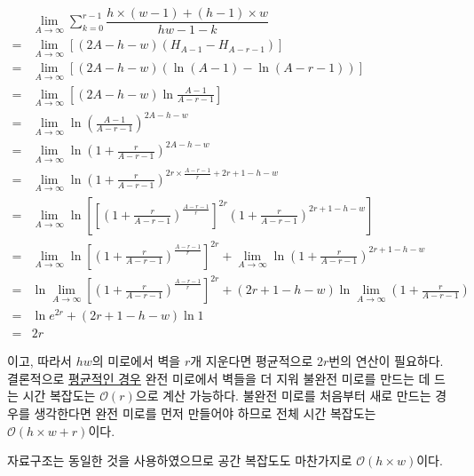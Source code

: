 \begin{align*}
    & \lim_{A\rightarrow\infty} \sum_{k=0}^{r-1} \dfrac{h \times \left(w - 1\right) + \left(h - 1\right) \times w}{hw - 1 - k} \\
    =& \lim_{A\rightarrow\infty} \left[\left(2A - h - w\right) \left(H_{A - 1} - H_{A - r - 1}\right)\right] \\
    =& \lim_{A\rightarrow\infty} \left[\left(2A - h - w\right) \left(\ln \left(A - 1\right) - \ln \left(A - r - 1\right)\right)\right] \\
    =& \lim_{A\rightarrow\infty} \left[\left(2A - h - w\right) \ln \frac{A - 1}{A - r - 1}\right] \\
    =& \lim_{A\rightarrow\infty} \ln \left(\frac{A - 1}{A - r - 1}\right)^{2A - h - w} \\
    =& \lim_{A\rightarrow\infty} \ln \left(1 + \frac{r}{A - r - 1}\right)^{2A - h - w} \\
    =& \lim_{A\rightarrow\infty} \ln \left(1 + \frac{r}{A - r - 1}\right)^{2r \times \frac{A - r - 1}{r} + 2r + 1 - h - w} \\
    =& \lim_{A\rightarrow\infty} \ln \left[\left[\left(1 + \frac{r}{A - r - 1}\right)^{\frac{A - r - 1}{r}}\right]^{2r} \left(1 + \frac{r}{A - r - 1}\right)^{2r + 1 - h - w}\right] \\
    =& \lim_{A\rightarrow\infty} \ln \left[\left(1 + \frac{r}{A - r - 1}\right)^{\frac{A - r - 1}{r}}\right]^{2r} + \lim_{A\rightarrow\infty} \ln \left(1 + \frac{r}{A - r - 1}\right)^{2r + 1 - h - w} \\
    =& \ln \lim_{A\rightarrow\infty} \left[\left(1 + \frac{r}{A - r - 1}\right)^{\frac{A - r - 1}{r}}\right]^{2r} + \left(2r + 1 - h - w\right) \ln \lim_{A\rightarrow\infty} \left(1 + \frac{r}{A - r - 1}\right) \\
    =& \ln e^{2r} + \left(2r + 1 - h - w\right) \ln 1\\
    =& 2r
\end{align*}

이고, 따라서 $hw$의 미로에서 벽을 $r$개 지운다면
평균적으로 $2r$번의 연산이 필요하다. 결론적으로 \underline{평균적인 경우} 완전 미로에서 벽들을 더 지워 불완전 미로를 만드는 데 드는 시간 복잡도는
$\mathcal{O}\left(r\right)$으로 계산 가능하다. 불완전 미로를 처음부터 새로 만드는 경우를 생각한다면
완전 미로를 먼저 만들어야 하므로 전체 시간 복잡도는 $\mathcal{O}\left(h\times w + r\right)$이다.

자료구조는 동일한 것을 사용하였으므로 공간 복잡도도 마찬가지로 $\mathcal{O}\left(h\times w\right)$이다.